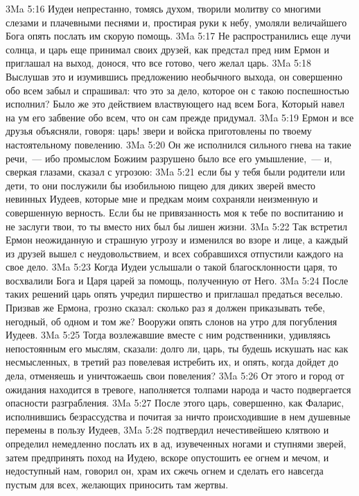 \vs 3Ma 5:16 Иудеи непрестанно, томясь духом, творили молитву со многими слезами и плачевными песнями и, простирая руки к небу, умоляли величайшего Бога опять послать им скорую помощь.
\vs 3Ma 5:17 Не распространились еще лучи солнца, и царь еще принимал своих друзей, как предстал пред ним Ермон и приглашал на выход, донося, что все готово, чего желал царь.
\vs 3Ma 5:18 Выслушав это и изумившись предложению необычного выхода, он совершенно обо всем забыл и спрашивал: что это за дело, которое он с такою поспешностью исполнил? Было же это действием властвующего над всем Бога, Который навел на ум его забвение обо всем, что он сам прежде придумал.
\vs 3Ma 5:19 Ермон и все друзья объясняли, говоря: царь! звери и войска приготовлены по твоему настоятельному повелению.
\vs 3Ma 5:20 Он же исполнился сильного гнева на такие речи,~--- ибо промыслом Божиим разрушено было все его умышление,~--- и, сверкая глазами, сказал с угрозою:
\vs 3Ma 5:21 если бы у тебя были родители или дети, то они послужили бы изобильною пищею для диких зверей вместо невинных Иудеев, которые мне и предкам моим сохраняли неизменную и совершенную верность. Если бы не привязанность моя к тебе по воспитанию и не заслуги твои, то ты вместо них был бы лишен жизни.
\vs 3Ma 5:22 Так встретил Ермон неожиданную и страшную угрозу и изменился во взоре и лице, а каждый из друзей вышел с неудовольствием, и всех собравшихся отпустили каждого на свое дело.
\vs 3Ma 5:23 Когда Иудеи услышали о такой благосклонности царя, то восхвалили Бога и Царя царей за помощь, полученную от Него.
\rsbpar\vs 3Ma 5:24 После таких решений царь опять учредил пиршество и приглашал предаться веселью. Призвав же Ермона, грозно сказал: сколько раз я должен приказывать тебе, негодный, об одном и том же? Вооружи опять слонов на утро для погубления Иудеев.
\vs 3Ma 5:25 Тогда возлежавшие вместе с ним родственники, удивляясь непостоянным его мыслям, сказали: долго ли, царь, ты будешь искушать нас как несмысленных, в третий раз повелевая истребить их, и опять, когда дойдет до дела, отменяешь и уничтожаешь свои повеления?
\vs 3Ma 5:26 От этого и город от ожидания находится в тревоге, наполняется толпами народа и часто подвергается опасности разграбления.
\vs 3Ma 5:27 После этого царь, совершенно, как Фаларис, исполнившись безрассудства и почитая за ничто происходившие в нем душевные перемены в пользу Иудеев,
\vs 3Ma 5:28 подтвердил нечестивейшею клятвою и определил немедленно послать их в ад, изувеченных ногами и ступнями зверей, затем предпринять поход на Иудею, вскоре опустошить ее огнем и мечом, и недоступный нам, говорил он, храм их сжечь огнем и сделать его навсегда пустым для всех, желающих приносить там жертвы.

